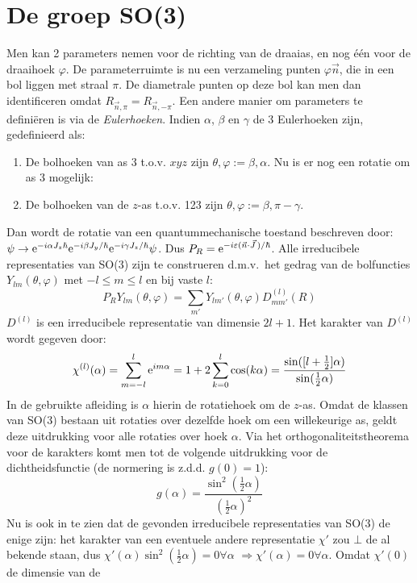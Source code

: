 \section{De groep SO(3)}
Men kan 2 parameters nemen voor de richting van de draaias, en nog \'e\'en
voor de draaihoek $\varphi$. De parameterruimte is nu een verzameling punten
$\varphi\vec{n}$, die in een bol liggen met straal $\pi$. De diametrale punten
op deze bol kan men dan identificeren omdat $R_{\vec{n},\pi}=R_{\vec{n},-\pi}$.
\npar
Een andere manier om parameters te defini\"eren is via de {\it Eulerhoeken}.
Indien $\alpha$, $\beta$ en $\gamma$ de 3 Eulerhoeken zijn, gedefinieerd als:
\begin{enumerate}
\item De bolhoeken van as 3 t.o.v. $xyz$ zijn $\theta,\varphi:=\beta,\alpha$.
      Nu is er nog een rotatie om as 3 mogelijk:
\item De bolhoeken van de $z$-as t.o.v. 123 zijn $\theta,\varphi:=\beta,\pi-\gamma$.
\end{enumerate}
Dan wordt de rotatie van een quantummechanische toestand beschreven door:\\
$\psi\rightarrow {\rm e}^{-i\alpha J_z\hbar}{\rm e}^{-i\beta J_y/\hbar}{\rm e}^{-i\gamma J_z/\hbar}\psi$.
Dus $\displaystyle P_R={\rm e}^{-i\varepsilon(\vec{n}\cdot\vec{J}\,)/\hbar}$.
\npar
Alle irreducibele representaties van SO(3) zijn te construeren d.m.v.\ het
gedrag van de bolfuncties $Y_{lm}(\theta,\varphi)$ met $-l\leq m\leq l$ en bij
vaste $l$:
\[
P_RY_{lm}(\theta,\varphi)=\sum_{m'}Y_{lm'}(\theta,\varphi)D^{(l)}_{mm'}(R)
\]
$D^{(l)}$ is een irreducibele representatie van dimensie $2l+1$. Het karakter
van $D^{(l)}$ wordt gegeven door:
\[
\chi^{(l)}(\alpha)=\sum_{m=-l}^{l}{\rm e}^{im\alpha}=1+2\sum_{k=0}^{l}\cos(k\alpha)=
\frac{\sin([l+\frac{1}{2}]\alpha)}{\sin(\frac{1}{2}\alpha)}
\]
In de gebruikte afleiding is $\alpha$ hierin de rotatiehoek om de $z$-as.
Omdat de klassen van SO(3) bestaan uit rotaties over dezelfde hoek om een
willekeurige as, geldt deze uitdrukking voor alle rotaties over hoek $\alpha$.
\npar
Via het orthogonaliteitstheorema voor de karakters komt men tot de volgende
uitdrukking voor de dichtheidsfunctie (de normering is z.d.d. $g(0)=1$):
\[
g(\alpha)=\frac{\sin^2(\frac{1}{2}\alpha)}{(\frac{1}{2}\alpha)^2}
\]
Nu is ook in te zien dat de gevonden irreducibele representaties van SO(3) de
enige zijn: het karakter van een eventuele andere representatie $\chi'$ zou
$\bot$ de al bekende staan, dus $\chi'(\alpha)\sin^2(\frac{1}{2}\alpha)=0\forall\alpha$
$\Rightarrow\chi'(\alpha)=0\forall\alpha$. Omdat $\chi'(0)$ de dimensie van de
